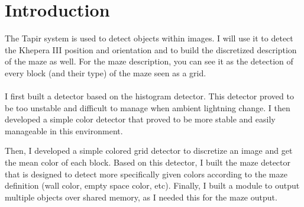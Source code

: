 \section{Introduction}

The Tapir system is used to detect objects within images. I will use 
it to detect the Khepera III position and orientation and to build the 
discretized description of the maze as well. For the maze description, 
you can see it as the detection of every block (and their type) of the 
maze seen as a grid.
\\
\\
I first built a detector based on the histogram detector. This detector 
proved to be too unstable and difficult to manage when ambient lightning 
change. I then developed a simple color detector that proved to be more 
stable and easily manageable in this environment. 

Then, I developed a simple colored grid detector to discretize an image 
and get the mean color of each block. Based on this detector, I built 
the maze detector that is designed to detect more specifically given 
colors according to the maze definition (wall color, empty space color, 
etc). Finally, I built a module to output multiple objects over shared 
memory, as I needed this for the maze output.
